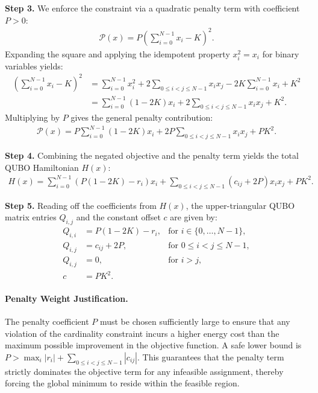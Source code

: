 \documentclass[12pt]{article}
\begin{document}
\textbf{Step 3.} We enforce the constraint via a quadratic penalty term with coefficient $P > 0$:
\begin{align}
  \mathcal{P}(x) = P \left( \sum_{i=0}^{N-1} x_i - K \right)^2.
\end{align}
Expanding the square and applying the idempotent property $x_i^2 = x_i$ for binary variables yields:
\begin{align}
  \left( \sum_{i=0}^{N-1} x_i - K \right)^2 &= \sum_{i=0}^{N-1} x_i^2 + 2 \sum_{0 \le i < j \le N-1} x_i x_j - 2K \sum_{i=0}^{N-1} x_i + K^2 \\
  &= \sum_{i=0}^{N-1} (1 - 2K) x_i + 2 \sum_{0 \le i < j \le N-1} x_i x_j + K^2.
\end{align}
Multiplying by $P$ gives the general penalty contribution:
\begin{align}
  \mathcal{P}(x) = P \sum_{i=0}^{N-1} (1 - 2K) x_i + 2P \sum_{0 \le i < j \le N-1} x_i x_j + P K^2.
\end{align}

\textbf{Step 4.} Combining the negated objective and the penalty term yields the total QUBO Hamiltonian $H(x)$:
\begin{align}
  H(x) = \sum_{i=0}^{N-1} \left( P(1-2K) - r_i \right) x_i + \sum_{0 \le i < j \le N-1} \left( c_{ij} + 2P \right) x_i x_j + P K^2.
\end{align}

\textbf{Step 5.} Reading off the coefficients from $H(x)$, the upper-triangular QUBO matrix entries $Q_{i,j}$ and the constant offset $c$ are given by:
\begin{align}
  Q_{i,i} &= P(1-2K) - r_i, & \text{for } i \in \{0, \dots, N-1\}, \\
  Q_{i,j} &= c_{ij} + 2P, & \text{for } 0 \le i < j \le N-1, \\
  Q_{i,j} &= 0, & \text{for } i > j, \\
  c &= P K^2.
\end{align}

\paragraph{Penalty Weight Justification.}
The penalty coefficient $P$ must be chosen sufficiently large to ensure that any violation of the cardinality constraint incurs a higher energy cost than the maximum possible improvement in the objective function. A safe lower bound is $P > \max_{i} |r_i| + \sum_{0 \le i < j \le N-1} |c_{ij}|$. This guarantees that the penalty term strictly dominates the objective term for any infeasible assignment, thereby forcing the global minimum to reside within the feasible region.
\end{document}
